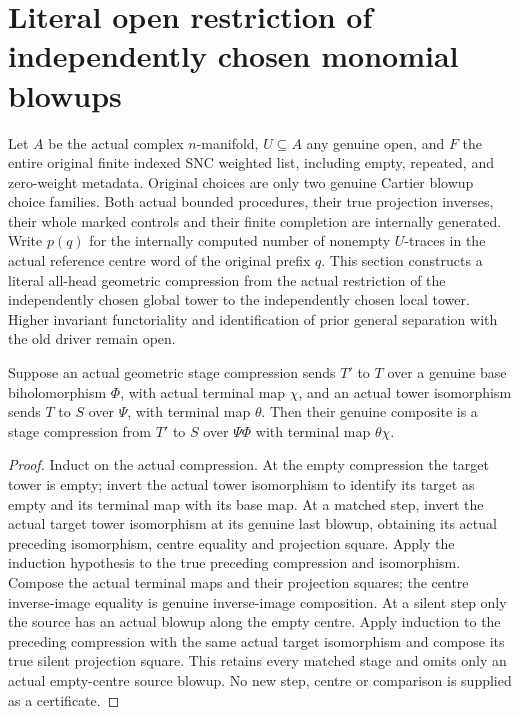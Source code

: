 \section{Literal open restriction of independently chosen monomial blowups}
Let $A$ be the actual complex $n$-manifold, $U\subseteq A$ any genuine open, and $F$ the entire original finite indexed SNC weighted list, including empty, repeated, and zero-weight metadata. Original choices are only two genuine Cartier blowup choice families. Both actual bounded procedures, their true projection inverses, their whole marked controls and their finite completion are internally generated. Write $p(q)$ for the internally computed number of nonempty $U$-traces in the actual reference centre word of the original prefix $q$. This section constructs a literal all-head geometric compression from the actual restriction of the independently chosen global tower to the independently chosen local tower. Higher invariant functoriality and identification of prior general separation with the old driver remain open.

\begin{lemma}
\label{hir:nc-ordered-choice-open-target-transport}
\leanok
{}
Suppose an actual geometric stage compression sends $T'$ to $T$ over a genuine base biholomorphism $\Phi$, with actual terminal map $\chi$, and an actual tower isomorphism sends $T$ to $S$ over $\Psi$, with terminal map $\theta$. Then their genuine composite is a stage compression from $T'$ to $S$ over $\Psi\Phi$ with terminal map $\theta\chi$.
\end{lemma}
\begin{proof}
Induct on the actual compression. At the empty compression the target tower is empty; invert the actual tower isomorphism to identify its target as empty and its terminal map with its base map. At a matched step, invert the actual target tower isomorphism at its genuine last blowup, obtaining its actual preceding isomorphism, centre equality and projection square. Apply the induction hypothesis to the true preceding compression and isomorphism. Compose the actual terminal maps and their projection squares; the centre inverse-image equality is genuine inverse-image composition. At a silent step only the source has an actual blowup along the empty centre. Apply induction to the preceding compression with the same actual target isomorphism and compose its true silent projection square. This retains every matched stage and omits only an actual empty-centre source blowup. No new step, centre or comparison is supplied as a certificate.
\end{proof}

